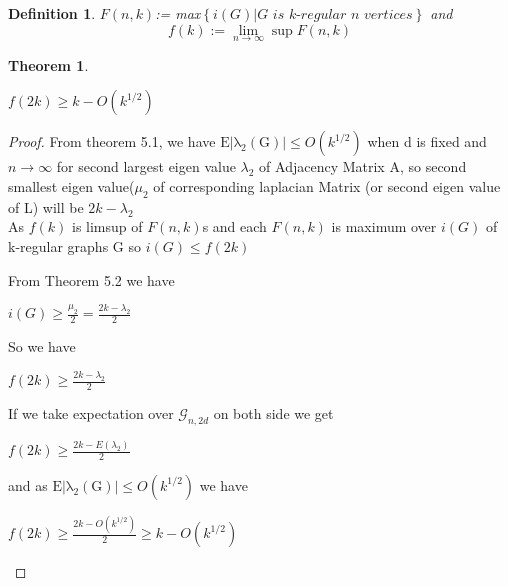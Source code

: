 \documentclass[oneside]{book}
\newtheorem{theorem}{Theorem}[section]
\newtheorem{mydef}{Definition}
\begin{document}
 \begin{mydef}
 
 
$F(n, k)$:= max$\left\{i(G)| \textit{G is k-regular  n vertices} \right\}$ 
and
$$
f(k):=\lim _{n \rightarrow \infty} \sup F(n, k)
$$
\end{mydef}
 
 
\begin{theorem}
 
 
  \begin{center}
    $f(2 k) \geq k-O\left(k^{1 / 2}\right)$ 
     \end{center}
    \end{theorem}
   
   
\begin{proof} From theorem 5.1, we have  $\mathrm{E|\lambda_{2}(G)|}
    \leq O(k^{1/2})$ when d is fixed and $n\rightarrow \infty$ for second largest eigen value $\lambda_{2}$ of Adjacency Matrix A, so second smallest eigen value($\mu_{2}$ of corresponding laplacian Matrix (or second eigen value of L) will be $2k - \lambda_{2}$ \\
     
     
   As $f(k)$ is limsup of $F(n,k)$s and each $F(n,k)$ is maximum over $i(G)$ of k-regular graphs G
   so $i(G)\leq f(2k)$
   
    From Theorem 5.2 we have
    \begin{center}
        $i(G) \geq \frac{\mu_2}{2} = \frac{2k - \lambda_{2}}{2} $ 
    \end{center}
    So we have
    
    \begin{center}
        $ f(2k) \geq \frac{2k - \lambda_{2}}{2}$
    \end{center}
  
      If we take expectation over $\mathscr{G}_{n, 2 d}$ on both side we get 
      \begin{center}
           $ f(2k) \geq \frac{2k - E(\lambda_{2})}{2}$
      \end{center}
      and as $\mathrm{E|\lambda_{2}(G)|}
    \leq O(k^{1/2})$ we have 
 \begin{center}
    $f(2k) \geq \frac{2k - O(k^{1/2})}{2} \geq k - O(k^{1/2}) $ 
 \end{center}
    
  \end{proof}  
    
\end{document}
